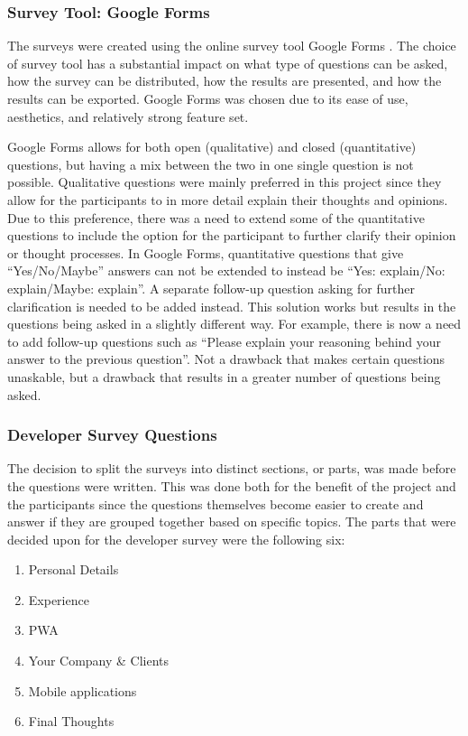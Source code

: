\documentclass[a4paper,12pt]{article}
\begin{document}
\subsubsection{Survey Tool: Google Forms}
\label{Project_surveyDesign_googleForms}
The surveys were created using the online survey tool Google Forms \cite{google_forms}. The choice of survey tool has a substantial impact on what type of questions can be asked, how the survey can be distributed, how the results are presented, and how the results can be exported. Google Forms was chosen due to its ease of use, aesthetics, and relatively strong feature set.

Google Forms allows for both open (qualitative) and closed (quantitative) questions, but having a mix between the two in one single question is not possible. Qualitative questions were mainly preferred in this project since they allow for the participants to in more detail explain their thoughts and opinions. Due to this preference, there was a need to extend some of the quantitative questions to include the option for the participant to further clarify their opinion or thought processes. In Google Forms, quantitative questions that give “Yes/No/Maybe” answers can not be extended to instead be “Yes: explain/No: explain/Maybe: explain”. A separate follow-up question asking for further clarification is needed to be added instead. This solution works but results in the questions being asked in a slightly different way. For example, there is now a need to add follow-up questions such as “Please explain your reasoning behind your answer to the previous question”. Not a drawback that makes certain questions unaskable, but a drawback that results in a greater number of questions being asked.

\subsubsection{Developer Survey Questions}
\label{Project_surveyDesign_devQuestions}
The decision to split the surveys into distinct sections, or parts, was made before the questions were written. This was done both for the benefit of the project and the participants since the questions themselves become easier to create and answer if they are grouped together based on specific topics. The parts that were decided upon for the developer survey were the following six:

\begin{enumerate}
    \item Personal Details
    \item Experience
    \item PWA
    \item Your Company \& Clients
    \item Mobile applications
    \item Final Thoughts
\end{enumerate}
\end{document}
